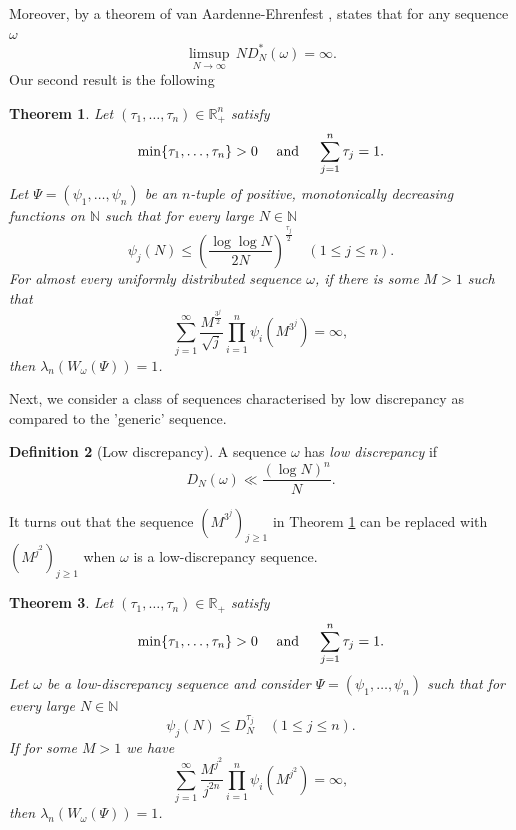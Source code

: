 \documentclass{amsart}
\newtheorem{theorem}{Theorem}[section]
\theoremstyle{definition}
\newtheorem{definition}[theorem]{Definition}
\newcommand{\N}{\mathbb N}%
\newcommand{\R}{\mathbb R}
\newcommand{\0}{\mbf 0}%
\renewcommand{\text}{\textup}
\def\N{\mathbb N}
\def\R{\mathbb R}
\begin{document}
Moreover, by a theorem of van Aardenne-Ehrenfest \cite[Ch. 2 Corollary 2.1]{KuipersNiederreiter1974}, states that for any sequence $\omega$ 
\[
\limsup_{N\to \infty}\, ND_N^*(\omega)=\infty.
\]
Our second result is the following
\begin{theorem}\label{TEO:UDM1S:Measure:01}
    Let $(\tau_1,\ldots,\tau_n)\in\R_{+}^n$ satisfy
    \[
    \min\{\tau_1,\ldots,\tau_n\}>0 \quad\text{ and }\quad \sum_{j=1}^n\tau_j = 1.
    \]
Let $\Psi=(\psi_{1},\dots,\psi_{n})$ be an $n$-tuple of positive, monotonically decreasing functions on $\N$ such that for every large $N\in\N$
     \begin{equation*}
         \psi_j(N)\leq \left(\frac{\log\log N}{2N}\right)^{\frac{\tau_j}{2}}
\quad
(1\leq j\leq n).
     \end{equation*}
     For almost every uniformly distributed sequence $\omega$, if there is some $M>1$ such that
    \[
    \sum_{j=1}^{\infty}\frac{M^{\frac{3^j}{2}}}{\sqrt{j}} \prod_{i=1}^n \psi_i\left(M^{3^j}\right)=\infty,
    \]
    then $\lambda_n\left( W_{\omega}(\Psi)\right)=1$.
\end{theorem}
Next, we consider a class of sequences characterised by low discrepancy as compared to the 'generic' sequence.
\begin{definition}[Low discrepancy]
    A sequence $\omega$ has \textit{low discrepancy} if
\begin{equation*}
    D_{N}(\omega) \ll \frac{(\log N)^{n}}{N}.
\end{equation*}
\end{definition}

It turns out that the sequence $(M^{3^j})_{j\geq 1}$ in Theorem \ref{TEO:UDM1S:Measure:01} can be replaced with $(M^{j^2})_{j\geq 1}$ when $\omega$ is a low-discrepancy sequence. 

\begin{theorem}\label{TEO:UDM1S:Measure:02}
    Let $(\tau_1,\ldots,\tau_n)\in\R_{+}$ satisfy
    \[
    \min\{\tau_1,\ldots,\tau_n\}>0 \quad\text{ and }\quad \sum_{j=1}^n\tau_j = 1.
    \]
     Let $\omega$ be a low-discrepancy sequence and consider $\Psi=(\psi_{1},\dots,\psi_{n})$ such that for every large $N\in\N$
     \begin{equation*}
         \psi_j(N)\leq D_N^{\tau_j}
\quad
(1\leq j\leq n).
     \end{equation*}
    If for some $M>1$ we have
    \[
    \sum_{j=1}^{\infty}\frac{M^{j^2}}{j^{2n}} \prod_{i=1}^n \psi_i\left(M^{j^2}\right)=\infty,
    \]
    then $\lambda_n\left( W_{\omega}(\Psi)\right)=1$.
\end{theorem}
\end{document}
